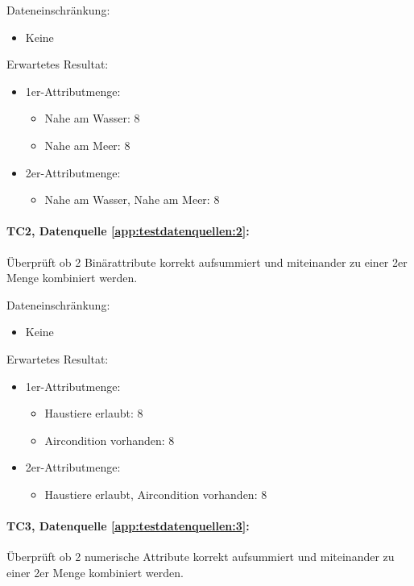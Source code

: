 Dateneinschränkung:
\begin{itemize}
	\item Keine
\end{itemize}

Erwartetes Resultat:
\begin{itemize}
	\item 1er-Attributmenge:
	\begin{itemize}
		\item Nahe am Wasser: 8
		\item Nahe am Meer: 8
	\end{itemize}
	\item 2er-Attributmenge:
	\begin{itemize}
		\item Nahe am Wasser, Nahe am Meer: 8
	\end{itemize}
\end{itemize}

\paragraph{TC2, Datenquelle \cref{app:testdatenquellen:2}:} Überprüft ob 2 Binärattribute korrekt aufsummiert und miteinander zu einer 2er Menge kombiniert werden. 

Dateneinschränkung:
\begin{itemize}
	\item Keine
\end{itemize}

Erwartetes Resultat:
\begin{itemize}
	\item 1er-Attributmenge:
	\begin{itemize}
		\item Haustiere erlaubt: 8
		\item Aircondition vorhanden: 8
	\end{itemize}
	\item 2er-Attributmenge:
	\begin{itemize}
		\item Haustiere erlaubt, Aircondition vorhanden: 8
	\end{itemize}
\end{itemize}

\paragraph{TC3, Datenquelle \cref{app:testdatenquellen:3}:} Überprüft ob 2 numerische Attribute korrekt aufsummiert und miteinander zu einer 2er Menge kombiniert werden. 

